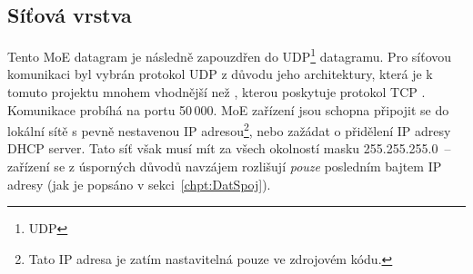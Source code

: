 \subsection{Síťová vrstva}\label{chpt:NetworkLayer}
Tento \acs{MoE} datagram je následně zapouzdřen do \acs{UDP}\footnote{\acl{UDP}} datagramu. Pro síťovou komunikaci byl vybrán protokol \acs{UDP} z důvodu jeho  architektury, která je k tomuto projektu mnohem vhodnější než , kterou poskytuje protokol TCP \cite{UDPpaper}. Komunikace probíhá na portu 50\,000.
\acs{MoE} zařízení jsou schopna připojit se do lokální sítě s pevně nestavenou IP adresou\footnote{Tato IP adresa je zatím nastavitelná pouze ve zdrojovém kódu.}, nebo zažádat o přidělení IP adresy DHCP server. Tato síť však musí mít za všech okolností masku 255.255.255.0~-- zařízení se z úsporných důvodů navzájem rozlišují \emph{pouze} posledním bajtem IP adresy (jak je popsáno v sekci~\ref{chpt:DatSpoj}).




